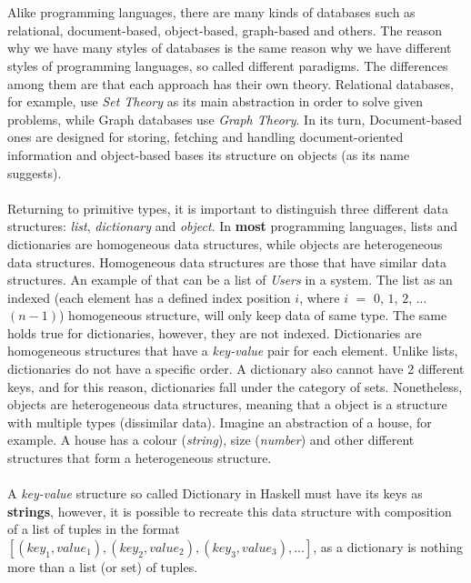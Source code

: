 \documentclass[conference]{IEEEtran}
\begin{document}
\\\\
Alike programming languages, there are many kinds of databases such as relational, document-based, object-based, graph-based and others. The reason why we have many styles of databases is the same reason why we have different styles of programming languages, so called different paradigms. The differences among them are that each approach has their own theory. Relational databases, for example, use \textit{Set Theory} as its main abstraction in order to solve given problems, while Graph databases use \textit{Graph Theory}. In its turn, Document-based ones are designed for storing, fetching and handling document-oriented information and object-based bases its structure on objects (as its name suggests).
\\\\
Returning to primitive types, it is important to distinguish three different data structures: \textit{list}, \textit{dictionary} and \textit{object}. In \textbf{most} programming languages, lists and dictionaries are homogeneous data structures, while objects are heterogeneous data structures. Homogeneous data structures are those that have similar data structures. An example of that can be a list of \textit{Users} in a system. The list as an indexed (each element has a defined index position $i$, where $i$ $=$ $0$, $1$, $2$, ...$(n-1)$) homogeneous structure, will only keep data of same type. The same holds true for dictionaries, however, they are not indexed. Dictionaries are homogeneous structures that have a \textit{key-value} pair for each element. Unlike lists, dictionaries do not have a specific order. A dictionary also cannot have 2 different keys, and for this reason, dictionaries fall under the category of sets. Nonetheless, objects are heterogeneous data structures, meaning that a object is a structure with multiple types (dissimilar data). Imagine an abstraction of a house, for example. A house has a colour (\textit{string}), size (\textit{number}) and other different structures that form a heterogeneous structure.
\\\\
A \textit{key-value} structure so called Dictionary in Haskell must have its keys as \textbf{strings}, however, it is possible to recreate this data structure with composition of a list of tuples in the format $[(key_1, value_1), (key_2, value_2), (key_3, value_3), ...]$, as a dictionary is nothing more than a list (or set) of tuples.
\\\\
\end{document}
